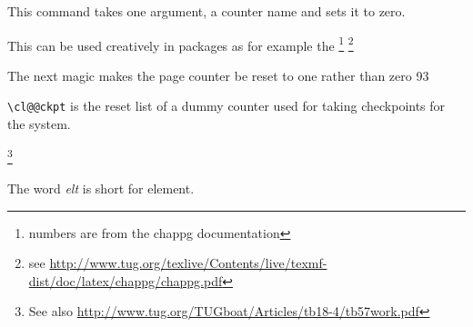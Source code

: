 
This command takes one argument, a counter name and sets it to zero.

\begin{teXXX}
 \def\@stpelt#1{\global\csname c@#1\endcsname \z@}
\end{teXXX}


This can be used creatively in packages as for example the \footnote{numbers are from the chappg documentation} \footnote{see \url{http://www.tug.org/texlive/Contents/live/texmf-dist/doc/latex/chappg/chappg.pdf}}

\begin{teXXX}
The next magic makes the page counter be reset to one rather than zero
93 \renewcommand\@stpelt[1]{%
94 \global\csname c@#1\endcsname
95 \expandafter\ifx \csname c@#1\endcsname \c@page
96 \@ne
97 \else
98 \z@
99 \fi
100 }
\end{teXXX}



\texttt{\textbackslash cl@@ckpt}
 is the  reset list of a dummy counter 
used for taking checkpoints for the  system.


\makeatletter
\def\@elt{,   }



\topline

{\footnotesize 
\cl@@ckpt 
}

\bottomline


\begin{teXX}
 \def\cl@@ckpt{\@elt{page}}
\end{teXX}

\footnote{See also \url{http://www.tug.org/TUGboat/Articles/tb18-4/tb57work.pdf}}

The word \textit{elt} is short for element.


